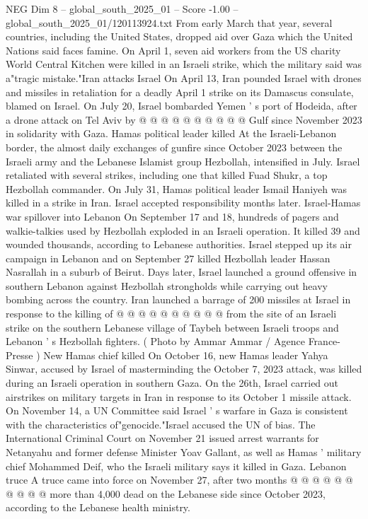 \begin{textsample}{NEG Dim 8 – global\_south\_2025\_01 – Score -1.00 – global\_south\_2025\_01/120113924.txt}
From early March that year, several countries, including the United States, dropped aid over Gaza which the United Nations said faces famine.
On April 1, seven aid workers from the US charity World Central Kitchen were killed in an Israeli strike, which the military said was a"tragic mistake."Iran attacks Israel On April 13, Iran pounded Israel with drones and missiles in retaliation for a deadly April 1 strike on its Damascus consulate, blamed on Israel.
On July 20, Israel bombarded Yemen ' s port of Hodeida, after a drone attack on Tel Aviv by @ @ @ @ @ @ @ @ @ @ Gulf since November 2023 in solidarity with Gaza.
Hamas political leader killed At the Israeli-Lebanon border, the almost daily exchanges of gunfire since October 2023 between the Israeli army and the Lebanese Islamist group Hezbollah, intensified in July.
Israel retaliated with several strikes, including one that killed Fuad Shukr, a top Hezbollah commander.
On July 31, Hamas political leader Ismail Haniyeh was killed in a strike in Iran.
Israel accepted responsibility months later.
Israel-Hamas war spillover into Lebanon On September 17 and 18, hundreds of pagers and walkie-talkies used by Hezbollah exploded in an Israeli operation.
It killed 39 and wounded thousands, according to Lebanese authorities.
Israel stepped up its air campaign in Lebanon and on September 27 killed Hezbollah leader Hassan Nasrallah in a suburb of Beirut.
Days later, Israel launched a ground offensive in southern Lebanon against Hezbollah strongholds while carrying out heavy bombing across the country.
Iran launched a barrage of 200 missiles at Israel in response to the killing of @ @ @ @ @ @ @ @ @ @ from the site of an Israeli strike on the southern Lebanese village of Taybeh between Israeli troops and Lebanon ' s Hezbollah fighters. ( Photo by Ammar Ammar / Agence France-Presse ) New Hamas chief killed On October 16, new Hamas leader Yahya Sinwar, accused by Israel of masterminding the October 7, 2023 attack, was killed during an Israeli operation in southern Gaza.
On the 26th, Israel carried out airstrikes on military targets in Iran in response to its October 1 missile attack.
On November 14, a UN Committee said Israel ' s warfare in Gaza is consistent with the characteristics of"genocide."Israel accused the UN of bias.
The International Criminal Court on November 21 issued arrest warrants for Netanyahu and former defense Minister Yoav Gallant, as well as Hamas ' military chief Mohammed Deif, who the Israeli military says it killed in Gaza.
Lebanon truce A truce came into force on November 27, after two months @ @ @ @ @ @ @ @ @ @ more than 4,000 dead on the Lebanese side since October 2023, according to the Lebanese health ministry.

\end{textsample}
